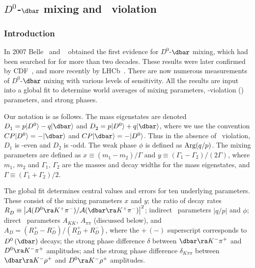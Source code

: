 \subsection{\emph{$D^0$-$\dbar$} mixing and \emph{\cp}\ violation}
\label{sec:charm:mixcpv}

\subsubsection{Introduction}

In 2007 Belle~\cite{Staric:2007dt} and \babar~\cite{Aubert:2007wf} 
obtained the first evidence for $D^0$-$\dbar$ mixing, which 
had been searched for for more than two decades. 
These results were later confirmed by CDF~\cite{Aaltonen:2007uc},
and more recently by LHCb~\cite{Aaij:2013wda}.
There are now numerous measurements of $D^0$-$\dbar$ mixing 
with various levels of sensitivity. All the results are
input into a global fit to determine
world averages of mixing parameters, \cp-violation (\cpv) 
parameters, and strong phases.

Our notation is as follows.
The mass eigenstates are denoted 
$D^{}_1 = p|D^0\rangle-q|\dbar\rangle$ and
$D^{}_2 = p|D^0\rangle+q|\dbar\rangle$, 
where we use the convention 
$CP|D^0\rangle=-|\dbar\rangle$ and 
$CP|\dbar\rangle=-|D^0\rangle$. Thus in the absence of 
\cp\ violation, $D^{}_1$ is \cp-even and $D^{}_2$ is \cp-odd.
The weak phase $\phi$ is defined as ${\rm Arg}(q/p)$.
The mixing parameters are defined as 
$x\equiv(m^{}_1-m^{}_2)/\Gamma$ and 
$y\equiv (\Gamma^{}_1-\Gamma^{}_2)/(2\Gamma)$, where 
$m^{}_1,\,m^{}_2$ and $\Gamma^{}_1,\,\Gamma^{}_2$ are
the masses and decay widths for the mass eigenstates,
and $\Gamma\equiv (\Gamma^{}_1+\Gamma^{}_2)/2$. 


The global fit determines central values and errors
for ten underlying parameters. These consist of the
mixing parameters $x$ and $y$; 
the ratio of decay rates
$R^{}_D\equiv\left|{\cal A}(D^0\ra K^+\pi^-)/
              {\cal A}(\dbar\ra K^+\pi^-)\right|^2$;
indirect \cpv\ parameters $|q/p|$ and $\phi$; 
direct \cpv\ parameters 
$A^{}_{KK}$, $A^{}_{\pi\pi}$ (discussed below), and
$A^{}_D =(R^+_D-R^-_D)/(R^+_D+R^-_D)$, where the $+\,(-)$
superscript corresponds to $D^0\,(\dbar)$ decays;
the strong phase difference
$\delta$ between $\dbar\ra K^-\pi^+$ and 
$D^0\ra K^-\pi^+$ amplitudes; and 
the strong phase difference $\delta^{}_{K\pi\pi}$ between 
$\dbar\ra K^-\rho^+$ and $D^0\ra K^-\rho^+$ amplitudes. 

